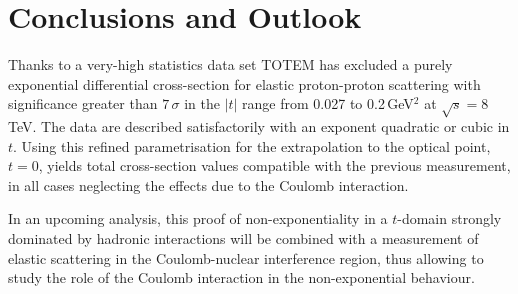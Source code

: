 
\section{Conclusions and Outlook}
\label{sec:conclusions}
%
Thanks to a very-high statistics data set TOTEM has excluded a purely exponential differential 
cross-section for elastic proton-proton scattering with significance greater than $7\,\sigma$
in the $|t|$ range from 0.027 to 0.2\,GeV$^{2}$ at $\sqrt{s}=8\,$TeV. The data
are described satisfactorily with an exponent quadratic or cubic in $t$.
Using this refined parametrisation for the extrapolation to the optical point,
$t = 0$, yields total cross-section values compatible with the previous measurement, in all cases
neglecting the effects due to the Coulomb interaction.

In an upcoming analysis, this proof of non-exponentiality in a 
$t$-domain strongly dominated by hadronic interactions will be combined with a measurement of 
elastic scattering in the Coulomb-nuclear interference region,
thus allowing to study the role of the Coulomb interaction in the non-exponential behaviour.
